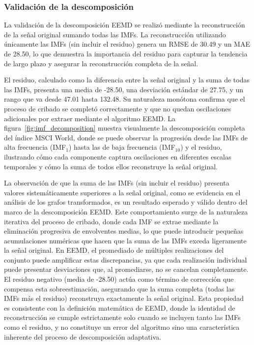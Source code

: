 \documentclass[11pt,a4paper]{article}
\begin{document}
\subsubsection{Validación de la descomposición}

La validación de la descomposición EEMD se realizó mediante la reconstrucción de la señal original sumando todas las IMFs. La reconstrucción utilizando únicamente las IMFs (sin incluir el residuo) genera un RMSE de 30.49 y un MAE de 28.50, lo que demuestra la importancia del residuo para capturar la tendencia de largo plazo y asegurar la reconstrucción completa de la señal.

El residuo, calculado como la diferencia entre la señal original y la suma de todas las IMFs, presenta una media de -28.50, una desviación estándar de 27.75, y un rango que va desde 47.01 hasta 132.48. Su naturaleza monótona confirma que el proceso de cribado se completó correctamente y que no quedan oscilaciones adicionales por extraer mediante el algoritmo EEMD. La figura~\ref{fig:imf_decomposition} muestra visualmente la descomposición completa del índice MSCI World, donde se puede observar la progresión desde las IMFs de alta frecuencia (IMF$_1$) hasta las de baja frecuencia (IMF$_{10}$) y el residuo, ilustrando cómo cada componente captura oscilaciones en diferentes escalas temporales y cómo la suma de todos ellos reconstruye la señal original.

La observación de que la suma de las IMFs (sin incluir el residuo) presenta valores sistemáticamente superiores a la señal original, como se evidencia en el análisis de los grafos transformados, es un resultado esperado y válido dentro del marco de la descomposición EEMD. Este comportamiento surge de la naturaleza iterativa del proceso de cribado, donde cada IMF se extrae mediante la eliminación progresiva de envolventes medias, lo que puede introducir pequeñas acumulaciones numéricas que hacen que la suma de las IMFs exceda ligeramente la señal original. En EEMD, el promediado de múltiples realizaciones del conjunto puede amplificar estas discrepancias, ya que cada realización individual puede presentar desviaciones que, al promediarse, no se cancelan completamente. El residuo negativo (media de -28.50) actúa como término de corrección que compensa esta sobreestimación, asegurando que la suma completa (todas las IMFs más el residuo) reconstruya exactamente la señal original. Esta propiedad es consistente con la definición matemática de EEMD, donde la identidad de reconstrucción se cumple estrictamente solo cuando se incluyen tanto las IMFs como el residuo, y no constituye un error del algoritmo sino una característica inherente del proceso de descomposición adaptativa.
\end{document}
